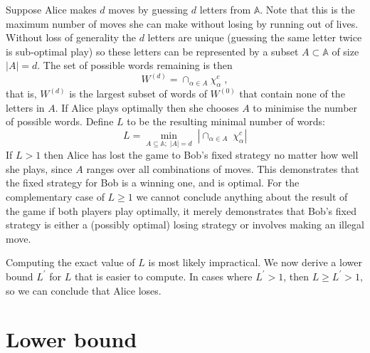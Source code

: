 \documentclass{article}
\begin{document}
{Suppose Alice makes $d$ moves by guessing $d$ letters from $\mathbb{A}$.
Note that this is the maximum number of moves she can make without losing by running out of
lives. Without loss of generality the $d$ letters are unique (guessing the same letter twice is sub-optimal play) so these letters can be represented by a subset $A \subset \mathbb{A}$ of size $|A| = d$. The set of possible words remaining is then
\begin{equation}
\label{wordsLeft}
W^{(d)} = \cap_{\alpha \in A} \chi_{\alpha}^c \;,
\end{equation}
that is, $W^{(d)}$ is the largest subset of words of $W^{(0)}$ that contain none of the letters in $A$. If Alice plays optimally then she chooses $A$ to minimise the number of possible words. Define $L$ to be the resulting minimal number of words:
\begin{equation}
\label{minWordsLeft}
L = \min_{A \subseteq \mathbb{A}; \; |A| = d} \; | \cap_{\alpha \in A} \; \chi_{\alpha}^c |
\end{equation}
If $L > 1$ then Alice has lost the game to Bob's fixed strategy no matter how well she plays, since $A$ ranges over all combinations of moves. This demonstrates that the fixed strategy for Bob is a winning one, and is optimal. For the complementary case of $L \geq 1$ we cannot conclude anything about the result of the game if both players play optimally, it merely demonstrates that Bob's fixed strategy is either a (possibly optimal) losing strategy or involves making an illegal move.

Computing the exact value of $L$ is most likely impractical. We now derive a lower bound
$L^{\prime}$ for $L$ that is easier to compute. In cases where $L^{\prime} > 1$,
then $L \geq L^{\prime} > 1$, so we can conclude that Alice loses.

\section{Lower bound}

}
\end{document}
